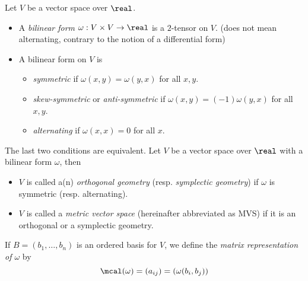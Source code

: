 \documentclass[../main-v2-manifolds.tex]{subfiles}
\begin{document}
    Let $V$ be a vector space over $\real$. 
    \begin{itemize}
        \item A \emph{bilinear form} $\omega: V\times V\to \real$ is a $2$-tensor on $V$. (does not mean alternating, contrary to the notion of a differential form)
        \item A bilinear form on $V$ is 
        \begin{itemize}
            \item \emph{symmetric} if $\omega(x,y) = \omega(y,x)$ for all $x,y$.
            \item \emph{skew-symmetric} or \emph{anti-symmetric} if $\omega(x,y) = (-1)\omega(y,x)$ for all $x,y$.
            \item \emph{alternating} if $\omega(x,x)=0$ for all $x$.
        \end{itemize}
    \end{itemize}

    The last two conditions are equivalent. Let $V$ be a vector space over $\real$ with a bilinear form $\omega$, then 
        \begin{itemize}
            \item $V$ is called a(n) \emph{orthogonal geometry} (resp. \emph{symplectic geometry}) if $\omega$ is symmetric (resp. alternating). 
            \item $V$ is called a \emph{metric vector space} (hereinafter abbreviated as MVS) if it is an orthogonal or a symplectic geometry.
        \end{itemize}
    \begin{definition}
        If $B=(b_1,\ldots,b_n)$ is an ordered basis for $V$, we define the \emph{matrix representation of $\omega$} by
        \[
            \mcal(\omega) = (a_{ij}) = (\omega(b_i, b_j))
        \]
    \end{definition}
    
\end{document}
